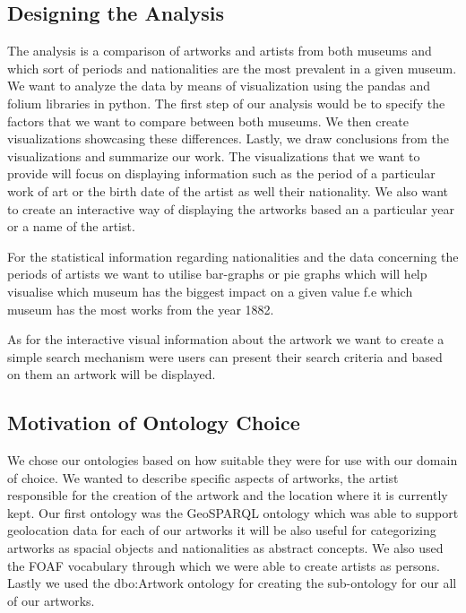 \documentclass{article}
\begin{document}
\subsection{Designing the Analysis}

The analysis is a comparison of artworks and artists from both museums and which sort of periods and nationalities are the most prevalent in a given museum. We want to analyze the data by means of visualization using the pandas and folium libraries in python.  The first step of our analysis would be to specify the factors that we want to compare between both museums. We then create visualizations showcasing these differences. Lastly, we draw conclusions from the visualizations and summarize our work. The visualizations that we want to provide will focus on displaying information such as the period of a particular work of art or the birth date of the artist as well their nationality. We also want to create an interactive way of displaying the artworks based an a particular year or a name of the artist.

For the statistical information regarding nationalities and the data concerning the periods of artists we want to utilise bar-graphs or pie graphs which will help visualise which museum has the biggest impact on a given value f.e which museum has the most works from the year 1882.

As for the interactive visual information about the artwork we want to create a simple search mechanism were users can present their search criteria and based on them an artwork will be displayed.

\subsection{Motivation of Ontology Choice}


We chose our ontologies based on how suitable they were for use with our domain of choice. We wanted to describe specific aspects of artworks, the artist responsible for the creation of the artwork and the location where it is currently kept. Our first ontology was the GeoSPARQL ontology\cite{GeoSparql} which was able to support geolocation data for each of our artworks it will be also useful for categorizing artworks as spacial objects and nationalities as abstract concepts. We also used the FOAF\cite{Foaf} vocabulary through which we were able to create artists as persons. Lastly we used the dbo:Artwork ontology\cite{Artwork} for creating the sub-ontology for our all of our artworks.
\end{document}
